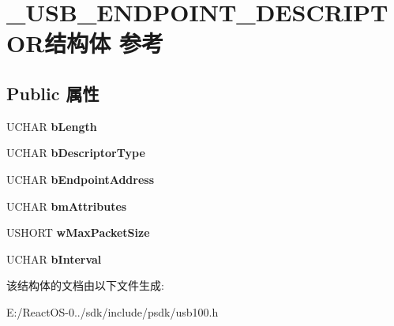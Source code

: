 \hypertarget{struct___u_s_b___e_n_d_p_o_i_n_t___d_e_s_c_r_i_p_t_o_r}{}\section{\+\_\+\+U\+S\+B\+\_\+\+E\+N\+D\+P\+O\+I\+N\+T\+\_\+\+D\+E\+S\+C\+R\+I\+P\+T\+O\+R结构体 参考}
\label{struct___u_s_b___e_n_d_p_o_i_n_t___d_e_s_c_r_i_p_t_o_r}
\subsection*{Public 属性}
\begin{DoxyCompactItemize}
\item 
\mbox{\label{struct___u_s_b___e_n_d_p_o_i_n_t___d_e_s_c_r_i_p_t_o_r_a5a5f9b60c985cae5189ba6d1b0c6cfa1}} 
U\+C\+H\+AR {\bfseries b\+Length}
\item 
\mbox{\label{struct___u_s_b___e_n_d_p_o_i_n_t___d_e_s_c_r_i_p_t_o_r_a291002d779e44e72a85a9a60d3b7b5f9}} 
U\+C\+H\+AR {\bfseries b\+Descriptor\+Type}
\item 
\mbox{\label{struct___u_s_b___e_n_d_p_o_i_n_t___d_e_s_c_r_i_p_t_o_r_aa933bcafb00f4b5dbd04843ad928b6f0}} 
U\+C\+H\+AR {\bfseries b\+Endpoint\+Address}
\item 
\mbox{\label{struct___u_s_b___e_n_d_p_o_i_n_t___d_e_s_c_r_i_p_t_o_r_ab7392c166319e4508553dd6e067107c5}} 
U\+C\+H\+AR {\bfseries bm\+Attributes}
\item 
\mbox{\label{struct___u_s_b___e_n_d_p_o_i_n_t___d_e_s_c_r_i_p_t_o_r_aae03b10ef300575e9c67f3f30ff9fb7b}} 
U\+S\+H\+O\+RT {\bfseries w\+Max\+Packet\+Size}
\item 
\mbox{\label{struct___u_s_b___e_n_d_p_o_i_n_t___d_e_s_c_r_i_p_t_o_r_a309ae3637c23079283abc263e2cb47f0}} 
U\+C\+H\+AR {\bfseries b\+Interval}
\end{DoxyCompactItemize}


该结构体的文档由以下文件生成\+:\begin{DoxyCompactItemize}
\item 
E\+:/\+React\+O\+S-\/0../sdk/include/psdk/usb100.\+h\end{DoxyCompactItemize}
